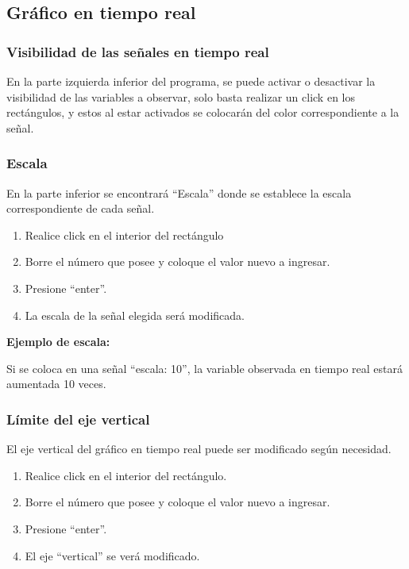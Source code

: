 \subsection{Gráfico en tiempo real}
\subsubsection{Visibilidad de las señales en tiempo real}
En la parte izquierda inferior del programa, se puede activar o desactivar la visibilidad de las variables a observar, solo basta realizar un click en los rectángulos, y estos al estar activados se colocarán del color correspondiente a la señal.

\subsubsection{Escala}
En la parte inferior se encontrará “Escala” donde se establece la escala correspondiente de cada señal.
\begin{enumerate}
	\item Realice click en el interior del rectángulo
	\item Borre el número que posee y coloque el valor nuevo a ingresar.
	\item Presione “enter”.
	\item La escala de la señal elegida será modificada.
	
\end{enumerate}

\textbf{Ejemplo de escala:}

Si se coloca en una señal “escala: 10”, la variable observada en tiempo real estará aumentada 10 veces.

\subsubsection{Límite del eje vertical}
El eje vertical del gráfico en tiempo real puede ser modificado según necesidad.

\begin{enumerate}
	\item Realice click en el interior del rectángulo.
	\item Borre el número que posee y coloque el valor nuevo a ingresar.
	\item Presione “enter”.
	\item El eje “vertical” se verá modificado.
	
\end{enumerate}


